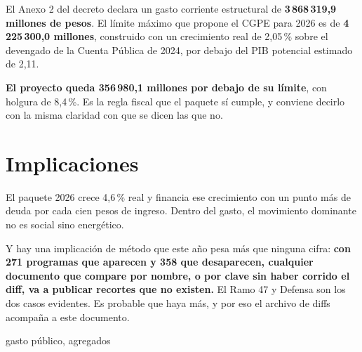 

El Anexo 2 del decreto declara un gasto corriente estructural de \textbf{3\,868\,319,9
millones de pesos}. El límite máximo que propone el CGPE para 2026 es de \textbf{4\,225\,300,0
millones}, construido con un crecimiento real de 2,05\,\% sobre el devengado de la Cuenta
Pública de 2024, por debajo del PIB potencial estimado de 2,11.

\textbf{El proyecto queda 356\,980,1 millones por debajo de su límite}, con holgura de
8,4\,\%. Es la regla fiscal que el paquete sí cumple, y conviene decirlo con la misma
claridad con que se dicen las que no.

\section{Implicaciones}

El paquete 2026 crece 4,6\,\% real y financia ese crecimiento con un punto más de deuda por
cada cien pesos de ingreso. Dentro del gasto, el movimiento dominante no es social sino
energético.

Y hay una implicación de método que este año pesa más que ninguna cifra: \textbf{con 271
programas que aparecen y 358 que desaparecen, cualquier documento que compare por nombre, o
por clave sin haber corrido el diff, va a publicar recortes que no existen.} El Ramo 47 y
Defensa son los dos casos evidentes. Es probable que haya más, y por eso el archivo de diffs
acompaña a este documento.

\begin{ficha}{gasto público, agregados}
\end{ficha}
\clearpage
